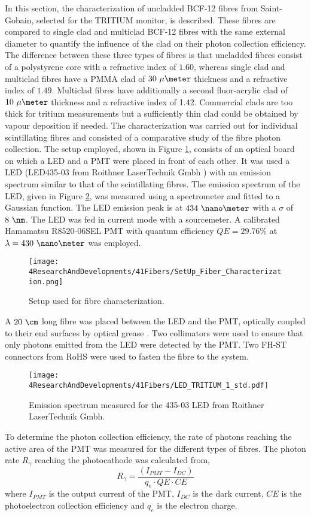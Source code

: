 In this section, the characterization of uncladded BCF-12 fibres from Saint-Gobain, selected for the TRITIUM monitor, is described. These fibres are compared to single clad and multiclad BCF-12 fibres with the same external diameter to quantify the influence of the clad on their photon collection efficiency. The difference between these three types of fibres is that uncladded fibres consist of a polystyrene core with a refractive index of $1.60$, whereas single clad and multiclad fibres have a PMMA clad of $30~\mu\meter$ thickness and a refractive index of $1.49$. Multiclad fibres have additionally a second fluor-acrylic clad of $10~\mu\meter$ thickness and a refractive index of 1.42. Commercial clads are too thick for tritium measurements but a sufficiently thin clad could be obtained by vapour deposition if needed. The characterization was carried out for individual scintillating fibres and consisted of a comparative study of the fibre photon collection. The setup employed, shown in Figure \ref{fig:SetUpFiberCharacterization}, consists of an optical board on which a LED and a PMT were placed in front of each other. It was used a LED (LED435-03 from Roithner LaserTechnik Gmbh \cite{LEDRLT}) with an emission spectrum similar to that of the scintillating fibres. The emission spectrum of the LED, given in Figure \ref{fig:LEDSpectrumTritium}, was measured using a spectrometer and fitted to a Gaussian function. The LED emission peak is at $434~\nano\meter$ with a $\sigma$ of $8~\nm$. The LED was fed in current mode with a sourcemeter. A calibrated Hamamatsu R8520-06SEL PMT with quantum efficiency $QE=29.76\%$ at $\lambda=430~\nano\meter$ was employed. 
\begin{figure}[h]
\centering
\texttt{[image: 4ResearchAndDevelopments/41Fibers/SetUp\_Fiber\_Characterization.png]}
\caption{Setup used for fibre characterization.\label{fig:SetUpFiberCharacterization}}
\end{figure}
A $20~\cm$ long fibre was placed between the LED and the PMT, optically coupled to their end surfaces by optical grease \cite{OpticalGrease}. Two collimators were used to ensure that only photons emitted from the LED were detected by the PMT. Two FH-ST connectors from RoHS \cite{FHSTFiberConector} were used to fasten the fibre to the system. 
\begin{figure}[h]
\centering
\texttt{[image: 4ResearchAndDevelopments/41Fibers/LED\_TRITIUM\_1\_std.pdf]}
\caption{Emission spectrum measured for the 435-03 LED from Roithner LaserTechnik Gmbh.\label{fig:LEDSpectrumTritium}}
\end{figure}
To determine the photon collection efficiency, the rate of photons reaching the active area of the PMT was measured for the different types of fibres. The photon rate $R_{\gamma}$ reaching the photocathode was calculated from,
\begin{equation}
R_{\gamma} = \frac{\left( I_{PMT} - I_{DC} \right)}{q_e \cdot{} QE \cdot{} CE}
\label{eq:NumPhotonsFromIntensityPMT}
\end{equation}
where $I_{PMT}$ is the output current of the PMT, $I_{DC}$ is the dark current, $CE$ is the photoelectron collection efficiency and $q_e$ is the electron charge.